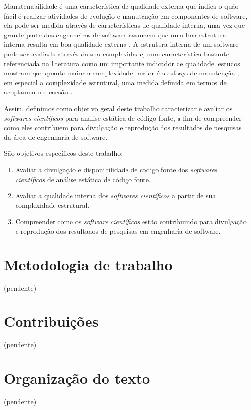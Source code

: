 Manutenabilidade é uma característica de qualidade externa que indica o quão
fácil é realizar atividades de evolução e manutenção em componentes de
software, ela pode ser medida através de características de qualidade interna,
uma vez que grande parte dos engenheiros de software assumem que uma boa
estrutura interna resulta em boa qualidade externa \cite{Fenton2014}. A
estrutura interna de um software pode ser avaliada através da sua complexidade,
uma característica bastante referenciada na literatura como um importante
indicador de qualidade, estudos mostram que quanto maior a complexidade, maior
é o esforço de manutenção \cite{hashim1996software, Darcy2005}, em especial a
complexidade estrutural, uma medida definida em termos de acoplamento e coesão
\cite{Terceiro2012}.

Assim, definimos como objetivo geral deste trabalho caracterizar e avaliar os
{\it softwares científicos} para análise estática de código fonte, a fim de
compreender como eles contribuem para divulgação e reprodução dos resultados de
pesquisas da área de engenharia de software.

São objetivos específicos deste trabalho:

\begin{enumerate}
  \item Avaliar a divulgação e disponibilidade de código fonte dos {\it softwares científicos} de análise estática de código fonte.
  \item Avaliar a qualidade interna dos {\it softwares científicos} a partir de sua complexidade estrutural.
  \item Compreender como os {\it software científicos} estão contribuindo para divulgação e reprodução dos resultados de pesquisas em engenharia de software.
\end{enumerate}

\section{Metodologia de trabalho}

(pendente)

\section{Contribuições}

(pendente)

\section{Organização do texto}

(pendente)

